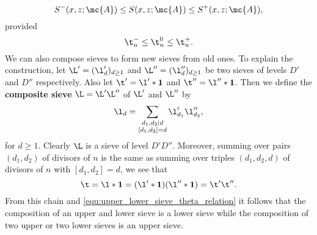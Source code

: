     \[
      S^{-}(x,z;\mc{A}) \le S(x,z;\mc{A}) \le S^{+}(x,z;\mc{A}),
    \]
    provided
    \begin{equation}\label{equ:upper_lower_sieve_theta_relation}
      \t_{n}^{-} \le \t_{n}^{0} \le \t_{n}^{+}.
    \end{equation}
    We can also compose sieves to form new sieves from old ones. To explain the construction, let $\L' = (\l'_{d})_{d \ge 1}$ and $\L'' = (\l''_{d})_{d \ge 1}$ be two sieves of levels $D'$ and $D''$ respectively. Also let $\t' = \l' \ast \mathbf{1}$ and $\t'' = \l'' \ast \mathbf{1}$. Then we define the \textbf{composite sieve} $\L = \L'\L''$ of $\L'$ and $\L''$ by
    \[
      \l_{d} = \sum_{\substack{ d_{1},d_{2} \mid d \\ [d_{1},d_{2}] = d}}\l'_{d_{1}}\l''_{d_{2}},
    \]
    for $d \ge 1$. Clearly $\L$ is a sieve of level $D'D''$. Moreover, summing over pairs $(d_{1},d_{2})$ of divisors of $n$ is the same as summing over triples $(d_{1},d_{2},d)$ of divisors of $n$ with $[d_{1},d_{2}] = d$, we see that
    \[
      \t = \l \ast \mathbf{1} = (\l' \ast \mathbf{1})(\l'' \ast \mathbf{1}) = \t'\t''.
    \]
    From this chain and \cref{equ:upper_lower_sieve_theta_relation} it follows that the composition of an upper and lower sieve is a lower sieve while the composition of two upper or two lower sieves is an upper sieve.

